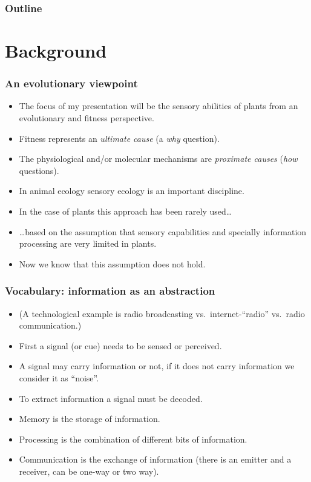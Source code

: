 \documentclass[10pt]{beamer}\usepackage[]{graphicx}\usepackage[]{color}
\begin{document}
	\begin{frame}
		\frametitle{Outline}
		\tableofcontents
	\end{frame}

\section{Background}

\begin{frame}%
  \frametitle{An evolutionary viewpoint}
  \begin{itemize}
    \item The focus of my presentation will be the sensory abilities of plants from an evolutionary and fitness perspective.
    \item Fitness represents an \emph{ultimate cause} (a \emph{why} question).
    \item The physiological and/or molecular mechanisms are \emph{proximate causes} (\emph{how} questions).
    \item In animal ecology sensory ecology is an important discipline.
    \item In the case of plants this approach has been rarely used\ldots
    \item \ldots based on the assumption that sensory capabilities and specially information processing are very limited in plants.
    \item Now we know that this assumption does not hold.
  \end{itemize}
\end{frame}

\begin{frame}%
  \frametitle{Vocabulary: information as an abstraction}
  \begin{itemize}
    \item (A technological example is radio broadcasting vs.\ internet-``radio'' vs.\ radio communication.)
    \item First a signal (or cue) needs to be sensed or perceived.
    \item A signal may carry information or not, if it does not carry information we consider it as ``noise''.
    \item To extract information a signal must be decoded.
    \item Memory is the storage of information.
    \item Processing is the combination of different bits of information.
    \item Communication is the exchange of information (there is an emitter and a receiver, can be one-way or two way).
  \end{itemize}
\end{frame}
\end{document}
